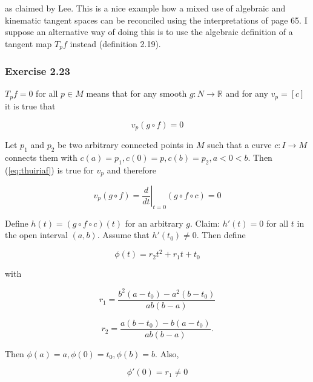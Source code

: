 \documentclass[12pt]{article}
\begin{document}
as claimed by Lee. This is a nice example how a mixed use of algebraic
and kinematic tangent spaces can be reconciled using the
interpretations of page 65. I suppose an alternative way of doing this
is to use the algebraic definition of a tangent map $T_{p}f$ instead
(definition 2.19).

\subsubsection{Exercise 2.23}
\label{subsubsection:jaighaec}

$T_{p}f=0$ for all $p\in{}M$ means that for any smooth
$g:N\rightarrow{}\mathbb{R}$ and for any $v_{p}=[c]$ it is true that

\begin{equation}
  \label{eq:thuiriaf}
  v_{p}(g\circ{}f)=0
\end{equation}

Let $p_{1}$ and $p_{2}$ be two arbitrary connected points in $M$ such
that a curve $c:I\rightarrow{}M$ connects them with
$c(a)=p_{1},c(0)=p,c(b)=p_{2},a<0<b$. Then (\ref{eq:thuiriaf}) is true
for $v_{p}$ and therefore

\begin{equation}
  \label{eq:yeiphaes}
  v_{p}(g\circ{}f)=\left.\frac{d}{dt}\right\vert_{t=0}\left(g\circ{}f\circ{}c\right)=0
\end{equation}

Define $h(t)=(g\circ{}f\circ{}c)(t)$ for an arbitrary $g$. Claim:
$h'(t)=0$ for all $t$ in the open interval $(a,b)$. Assume that
$h'(t_{0})\neq{}0$. Then define

\begin{equation}
  \label{eq:ohngeihi}
  \phi(t)=r_{2}t^{2}+r_{1}t+t_{0}
\end{equation}

with

\begin{equation}
  \label{eq:laucaequ}
  r_{1}=\frac{b^{2}(a-t_{0})-a^{2}(b-t_{0})}{ab(b-a)}
\end{equation}

\begin{equation}
  \label{eq:ohjireeg}
  r_{2}=\frac{a(b-t_{0})-b(a-t_{0})}{ab(b-a)}.
\end{equation}

Then $\phi(a)=a,\phi(0)=t_{0},\phi(b)=b$. Also,

\begin{equation}
  \label{eq:aifoheif}
  \phi'(0)=r_{1}\neq{}0
\end{equation}
\end{document}
